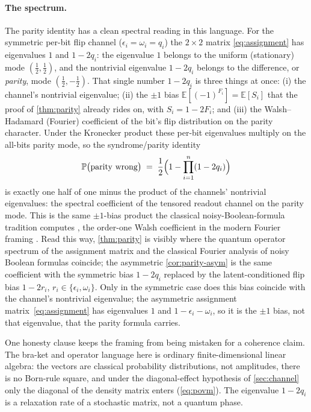 \documentclass[11pt]{article}
\numberwithin{equation}{section}
\theoremstyle{plain}
\theoremstyle{definition}
\theoremstyle{remark}
\newcommand{\eps}{\epsilon}
\newcommand{\Prob}{\mathbb{P}}
\begin{document}
\paragraph{The spectrum.} The parity identity has a clean spectral reading in
this language. For the symmetric per-bit flip channel ($\eps_i=\omega_i=q_i$) the
$2\times2$ matrix \eqref{eq:assignment} has eigenvalues $1$ and $1-2q_i$: the
eigenvalue $1$ belongs to the uniform (stationary) mode $(\tfrac12,\tfrac12)$,
and the nontrivial eigenvalue $1-2q_i$ belongs to the difference, or
\emph{parity}, mode $(\tfrac12,-\tfrac12)$. That single number $1-2q_i$ is three
things at once: (i) the channel's nontrivial eigenvalue; (ii) the $\pm1$ bias
$\mathbb{E}[(-1)^{F_i}]=\mathbb{E}[S_i]$ that the proof of \cref{thm:parity}
already rides on, with $S_i=1-2F_i$; and (iii) the Walsh--Hadamard (Fourier)
coefficient of the bit's flip distribution on the parity character. Under the
Kronecker product these per-bit eigenvalues multiply on the all-bits parity mode,
so the syndrome/parity identity
\begin{equation}
\label{eq:parity-spectral}
  \Prob\bigl(\text{parity wrong}\bigr)
  \;=\; \frac12\Bigl(1 - \prod_{i=1}^{n}(1-2q_i)\Bigr)
\end{equation}
is exactly one half of one minus the product of the channels' nontrivial
eigenvalues: the spectral coefficient of the tensored readout channel on the
parity mode. This is the same $\pm1$-bias product the classical
noisy-Boolean-formula tradition computes \citep{vonneumann1956,pippenger1988},
the order-one Walsh coefficient in the modern Fourier framing \citep{odonnell2014}.
Read this way, \cref{thm:parity} is visibly where the quantum operator spectrum
of the assignment matrix and the classical Fourier analysis of noisy Boolean
formulas coincide; the asymmetric \cref{cor:parity-asym} is the same coefficient
with the symmetric bias $1-2q_i$ replaced by the latent-conditioned flip bias
$1-2r_i$, $r_i\in\{\eps_i,\omega_i\}$. Only in the symmetric case does this bias
coincide with the channel's nontrivial eigenvalue; the asymmetric assignment
matrix~\eqref{eq:assignment} has eigenvalues $1$ and $1-\eps_i-\omega_i$, so it
is the $\pm1$ bias, not that eigenvalue, that the parity formula carries.

One honesty clause keeps the framing from being mistaken for a coherence claim.
The bra-ket and operator language here is ordinary finite-dimensional linear
algebra: the vectors are classical probability distributions, not amplitudes,
there is no Born-rule square, and under the diagonal-effect hypothesis of
\cref{sec:channel} only the diagonal of the density matrix enters
(\cref{eq:povm}). The eigenvalue $1-2q_i$ is a relaxation rate of a stochastic
matrix, not a quantum phase.
\end{document}
